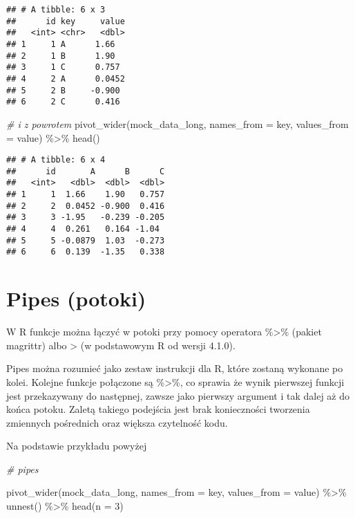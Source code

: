 \documentclass[
]{book}
\newenvironment{Shaded}{\begin{snugshade}}{\end{snugshade}}
\newcommand{\AttributeTok}[1]{\textcolor[rgb]{0.77,0.63,0.00}{#1}}
\newcommand{\CommentTok}[1]{\textcolor[rgb]{0.56,0.35,0.01}{\textit{#1}}}
\newcommand{\DecValTok}[1]{\textcolor[rgb]{0.00,0.00,0.81}{#1}}
\newcommand{\FunctionTok}[1]{\textcolor[rgb]{0.00,0.00,0.00}{#1}}
\newcommand{\NormalTok}[1]{#1}
\newcommand{\SpecialCharTok}[1]{\textcolor[rgb]{0.00,0.00,0.00}{#1}}
\begin{document}
\begin{verbatim}
## # A tibble: 6 x 3
##      id key     value
##   <int> <chr>   <dbl>
## 1     1 A      1.66  
## 2     1 B      1.90  
## 3     1 C      0.757 
## 4     2 A      0.0452
## 5     2 B     -0.900 
## 6     2 C      0.416
\end{verbatim}

\begin{Shaded}
\begin{Highlighting}[]
\CommentTok{\# i z powrotem}
\FunctionTok{pivot\_wider}\NormalTok{(mock\_data\_long, }\AttributeTok{names\_from =}\NormalTok{ key, }\AttributeTok{values\_from =}\NormalTok{ value) }\SpecialCharTok{\%\textgreater{}\%} \FunctionTok{head}\NormalTok{()}
\end{Highlighting}
\end{Shaded}

\begin{verbatim}
## # A tibble: 6 x 4
##      id       A      B      C
##   <int>   <dbl>  <dbl>  <dbl>
## 1     1  1.66    1.90   0.757
## 2     2  0.0452 -0.900  0.416
## 3     3 -1.95   -0.239 -0.205
## 4     4  0.261   0.164 -1.04 
## 5     5 -0.0879  1.03  -0.273
## 6     6  0.139  -1.35   0.338
\end{verbatim}

\hypertarget{pipes-potoki}{%
\section{Pipes (potoki)}\label{pipes-potoki}}

W R funkcje można łączyć w potoki przy pomocy operatora \%\textgreater\% (pakiet magrittr) albo \textbar\textgreater{} (w podstawowym R od wersji 4.1.0).

Pipes można rozumieć jako zestaw instrukcji dla R, które zostaną wykonane po kolei. Kolejne funkcje połączone są \%\textgreater\%, co sprawia że wynik pierwszej funkcji jest przekazywany do następnej, zawsze jako pierwszy argument i tak dalej aż do końca potoku. Zaletą takiego podejścia jest brak konieczności tworzenia zmiennych pośrednich oraz większa czytelność kodu.

Na podstawie przykładu powyżej

\begin{Shaded}
\begin{Highlighting}[]
\CommentTok{\# pipes}

\FunctionTok{pivot\_wider}\NormalTok{(mock\_data\_long, }\AttributeTok{names\_from =}\NormalTok{ key, }\AttributeTok{values\_from =}\NormalTok{ value) }\SpecialCharTok{\%\textgreater{}\%} \FunctionTok{unnest}\NormalTok{() }\SpecialCharTok{\%\textgreater{}\%} \FunctionTok{head}\NormalTok{(}\AttributeTok{n =} \DecValTok{3}\NormalTok{)}
\end{Highlighting}
\end{Shaded}
\end{document}
